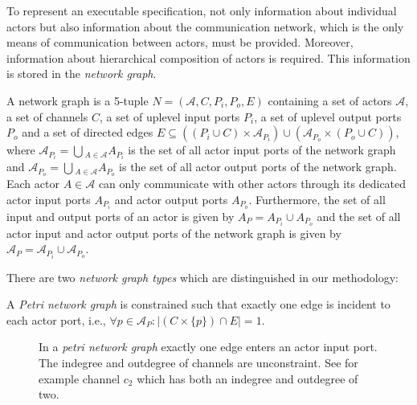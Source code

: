 To represent an executable specification, not only information about
individual actors but also information about the communication network,
which is the only means of communication between actors,
must be provided. Moreover, information about hierarchical
composition of actors is required. This information is stored in
the \emph{network graph}.

\begin{definition}
A network graph is a 5-tuple $N=(\mathcal{A},C,P_{i},P_{o},E)$ containing
a set of actors $\mathcal{A}$, a set of channels $C$, a set of uplevel
input ports $P_{i}$, a set of uplevel output ports $P_{o}$ and a set of
directed edges $E \subseteq ((P_{i} \cup C) \times \mathcal{A}_{P_{i}})
\cup (\mathcal{A}_{P_{o}} \times (P_{o} \cup C))$, where
$\mathcal{A}_{P_{i}} = \bigcup{}_{A \in \mathcal{A}} A_{P_{i}}$
is the set of all actor input ports of the network graph and
$\mathcal{A}_{P_{o}} = \bigcup{}_{A \in \mathcal{A}} A_{P_{o}}$
is the set of all actor output ports of the network graph.
Each actor $A \in \mathcal{A}$ can only communicate with other actors
through its dedicated actor input ports $A_{P_{i}}$ and
actor output ports $A_{P_{o}}$.
Furthermore, the set of all input and output ports of an actor
is given by $A_{P} = A_{P_{i}} \cup A_{P_{o}}$ and
the set of all actor input and actor output ports of the network graph
is given by $\mathcal{A}_{P} = \mathcal{A}_{P_{i}} \cup \mathcal{A}_{P_{o}}$.

\end{definition}

There are two \emph{network graph types} which are distinguished in our methodology:

\begin{definition}\label{petri-network-graph}
  A \emph{Petri network graph} is constrained such that exactly
  one edge is incident to each actor port,
  i.e., $\forall{p \in \mathcal{A}_{P}}: |(C \times \{p\}) \cap E| = 1$.
\end{definition}

\begin{figure}
\centering

\caption{\label{ng-petri}In a \emph{petri network graph} exactly
  one edge enters an actor input port. The
  indegree and outdegree of channels are
  unconstraint. See for example channel $c_2$
  which has both an indegree and outdegree of
  two.}
\end{figure}

